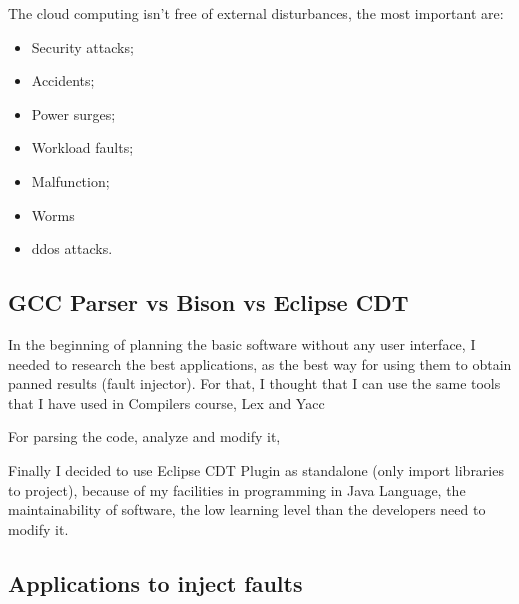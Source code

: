 The cloud computing isn't free of external disturbances\cite{wolter2012resilience}, the most important are:
\begin{itemize}
 	\item Security attacks;
 	\item Accidents;
 	\item Power surges;
 	\item Workload faults;
 	\item Malfunction;
 	\item Worms
 	\item \ac{ddos} attacks.
 \end{itemize}


\subsection{GCC Parser vs Bison vs Eclipse CDT}

In the beginning of planning the basic software without any user interface, I needed to research the best applications, as the best way for using them to obtain panned results (fault injector).
For that, I thought that I can use the same tools that I have used in Compilers course, Lex and Yacc

For parsing the code, analyze and modify it,



Finally I decided to use Eclipse CDT Plugin as standalone (only import libraries to project), because of my facilities in programming in Java Language, the maintainability of software, the low learning level than the developers need to modify it.






\subsection{Applications to inject faults}


\newpage
